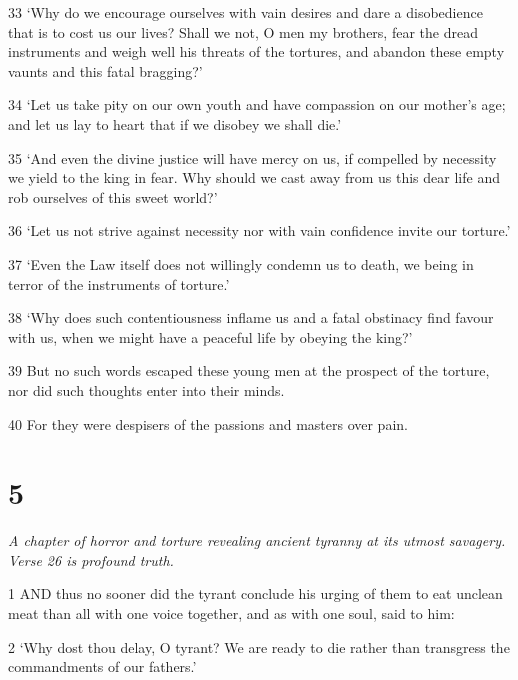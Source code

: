 \par 33 ‘Why do we encourage ourselves with vain desires and dare a disobedience that is to cost us our lives? Shall we not, O men my brothers, fear the dread instruments and weigh well his threats of the tortures, and abandon these empty vaunts and this fatal bragging?’

\par 34 ‘Let us take pity on our own youth and have compassion on our mother's age; and let us lay to heart that if we disobey we shall die.’

\par 35 ‘And even the divine justice will have mercy on us, if compelled by necessity we yield to the king in fear. Why should we cast away from us this dear life and rob ourselves of this sweet world?’

\par 36 ‘Let us not strive against necessity nor with vain confidence invite our torture.’

\par 37 ‘Even the Law itself does not willingly condemn us to death, we being in terror of the instruments of torture.’

\par 38 ‘Why does such contentiousness inflame us and a fatal obstinacy find favour with us, when we might have a peaceful life by obeying the king?’

\par 39 But no such words escaped these young men at the prospect of the torture, nor did such thoughts enter into their minds.

\par 40 For they were despisers of the passions and masters over pain.

\chapter{5}

\par \textit{A chapter of horror and torture revealing ancient tyranny at its utmost savagery. Verse 26 is profound truth.}

\par 1 AND thus no sooner did the tyrant conclude his urging of them to eat unclean meat than all with one voice together, and as with one soul, said to him:

\par 2 ‘Why dost thou delay, O tyrant? We are ready to die rather than transgress the commandments of our fathers.’

